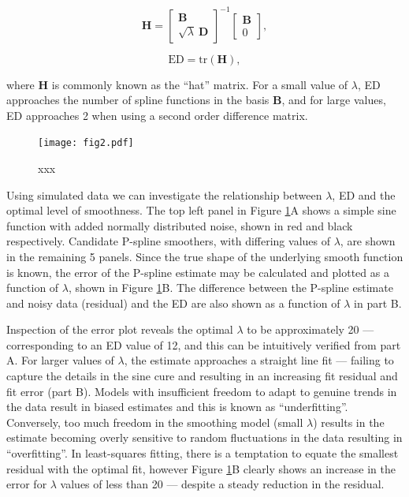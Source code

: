 \documentclass[num-refs]{wiley-article}
\begin{document}
\begin{equation}
  \mathbf{H} =
  \begin{bmatrix}
    \mathbf{B} \\ \sqrt{\lambda}\ \mathbf{D}
  \end{bmatrix}^{-1}
  \begin{bmatrix}
    \mathbf{B} \\ 0
  \end{bmatrix},
\end{equation}

\begin{equation}
  \textrm{ED} = \mathrm{tr}(\mathbf{H}),
\end{equation}

where $\mathbf{H}$ is commonly known as the ``hat'' matrix. For a small value of $\lambda$, ED approaches the number of spline functions in the basis $\mathbf{B}$, and for large values, ED approaches 2 when using a second order difference matrix.

\begin{figure}
  \begin{center}
    \texttt{[image: fig2.pdf]}
    \caption{xxx}
    \label{pspline_error}
  \end{center}
\end{figure}

Using simulated data we can investigate the relationship between $\lambda$, ED and the optimal level of smoothness. The top left panel in Figure \ref{pspline_error}A shows a simple sine function with added normally distributed noise, shown in red and black respectively. Candidate P-spline smoothers, with differing values of $\lambda$, are shown in the remaining 5 panels. Since the true shape of the underlying smooth function is known, the error of the P-spline estimate may be calculated and plotted as a function of $\lambda$, shown in Figure \ref{pspline_error}B. The difference between the P-spline estimate and noisy data (residual) and the ED are also shown as a function of $\lambda$ in part B.


Inspection of the error plot reveals the optimal $\lambda$ to be approximately 20 --- corresponding to an ED value of 12, and this can be intuitively verified from part A. For larger values of $\lambda$, the estimate approaches a straight line fit --- failing to capture the details in the sine cure and resulting in an increasing fit residual and fit error (part B). Models with insufficient freedom to adapt to genuine trends in the data result in biased estimates and this is known as ``underfitting''. Conversely, too much freedom in the smoothing model (small $\lambda$) results in the estimate becoming overly sensitive to random fluctuations in the data resulting in ``overfitting''. In least-squares fitting, there is a temptation to equate the smallest residual with the optimal fit, however Figure \ref{pspline_error}B clearly shows an increase in the error for $\lambda$ values of less than 20 --- despite a steady reduction in the residual.
\end{document}
